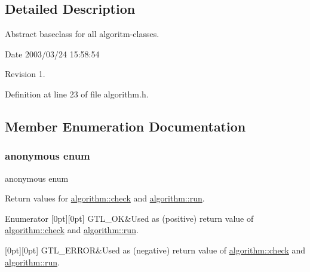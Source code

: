 \subsection{Detailed Description}
Abstract baseclass for all algoritm-\/classes. 

\begin{DoxyParagraph}{Date}
2003/03/24 15\+:58\+:54 
\end{DoxyParagraph}
\begin{DoxyParagraph}{Revision}
1. 
\end{DoxyParagraph}


Definition at line 23 of file algorithm.\+h.



\subsection{Member Enumeration Documentation}
\mbox{\label{classalgorithm_af1a0078e153aa99c24f9bdf0d97f6710}} 
\subsubsection{\texorpdfstring{anonymous enum}{anonymous enum}}
{\footnotesize\ttfamily anonymous enum}



Return values for \mbox{\hyperlink{classalgorithm_a76361fb03ad1cf643affc51821e43bed}{algorithm\+::check}} and \mbox{\hyperlink{classalgorithm_a734b189509a8d6b56b65f8ff772d43ca}{algorithm\+::run}}. 

\begin{DoxyEnumFields}{Enumerator}
[0pt][0pt]{}\mbox{\label{classalgorithm_af1a0078e153aa99c24f9bdf0d97f6710a5114c20e4a96a76b5de9f28bf15e282b}} 
G\+T\+L\+\_\+\+OK&Used as (positive) return value of \mbox{\hyperlink{classalgorithm_a76361fb03ad1cf643affc51821e43bed}{algorithm\+::check}} and \mbox{\hyperlink{classalgorithm_a734b189509a8d6b56b65f8ff772d43ca}{algorithm\+::run}}. \\
\hline

[0pt][0pt]{}\mbox{\label{classalgorithm_af1a0078e153aa99c24f9bdf0d97f6710a6fcf574690bbd6cf710837a169510dd7}} 
G\+T\+L\+\_\+\+E\+R\+R\+OR&Used as (negative) return value of \mbox{\hyperlink{classalgorithm_a76361fb03ad1cf643affc51821e43bed}{algorithm\+::check}} and \mbox{\hyperlink{classalgorithm_a734b189509a8d6b56b65f8ff772d43ca}{algorithm\+::run}}. \\
\hline

\end{DoxyEnumFields}


